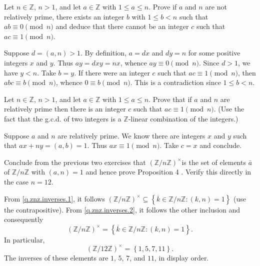 \begin{questions}
\question\label{q.znz.inverses.1}
    Let \(n \in \mathbb{Z}\), \(n>1\), and let \(a \in \mathbb{Z}\) with \(1 \leq a \leq n\). Prove if \(a\) and \(n\) are not relatively prime, there exists an integer \(b\) with \(1 \leq b<n\) such that \(a b \equiv 0\pmod n\) and deduce that there cannot be an integer \(c\) such that \(a c \equiv 1\pmod n\).
\begin{theproof}
    Suppose \(d=(a,n ) > 1\).
    By definition, \( a = dx \) and \(dy = n\) for some positive integers \(x\)  and \(y\).
    Thus \(ay = dxy = nx\), whence \(ay \equiv 0\pmod n\). Since \(d >1\), we have \(y < n\). 
    Take \(b = y\).
    If there were an integer \(c\) such that \(a c \equiv 1\pmod n\), then \(abc \equiv b \pmod n\), whence \(0\equiv b\pmod n\). This is a contradiction since \(1 \leq b<n\).
\end{theproof}


\question\label{q.znz.inverses.2}
    Let \(n \in \mathbb{Z}\), \(n>1\), and let \(a \in \mathbb{Z}\) with \(1 \leq a \leq n\). Prove that if \(a\) and \(n\) are relatively prime then there is an integer \(c\) such that \(a c \equiv 1\pmod n\). (Use the fact that the g.c.d. of two integers is a \(\mathbb{Z}\)-linear combination of the integers.)
\begin{theproof}
    Suppose \(a\) and \(n\) are relatively prime. We know there are integers \(x\) and \(y\) such that \(ax+ny = (a,b) = 1\). Thus \(ax \equiv  1\pmod n\). Take \(c=x\) and conclude.
\end{theproof}


\question
    Conclude from the previous two exercises that \((\mathbb{Z} / n \mathbb{Z})^{\times}\)is the set of elements \(\bar{a}\) of \(\mathbb{Z} / n \mathbb{Z}\) with \((a, n)=1\) and hence prove Proposition 4 . Verify this directly in the case \(n=12\).
\begin{solution}
From \ref{q.znz.inverses.1},  it follows  \((\mathbb{Z} / n \mathbb{Z})^{\times}\subseteq \left\{ \overline{k}\in\mathbb{Z} / n \mathbb{Z} : (k,n) = 1 \right\}\)  (use the contrapositive). From \ref{q.znz.inverses.2}, it follows the other inclusion and consequently \[(\mathbb{Z} / n \mathbb{Z})^{\times}= \left\{ \overline{k}\in\mathbb{Z} / n \mathbb{Z} : (k,n) = 1 \right\}.\]
In particular, \[
    (\mathbb{Z} / 12 \mathbb{Z})^{\times}=
    \left\{ 
        1,5,7,11
     \right\}.
\] The inverses of these elements are \(1\), \(5\), \(7\), and \(11\), in display order.
\end{solution}



\end{questions}
